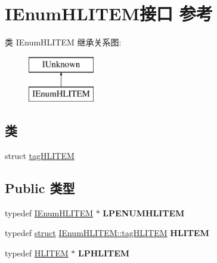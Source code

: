 \hypertarget{interface_i_enum_h_l_i_t_e_m}{}\section{I\+Enum\+H\+L\+I\+T\+E\+M接口 参考}
\label{interface_i_enum_h_l_i_t_e_m}
类 I\+Enum\+H\+L\+I\+T\+EM 继承关系图\+:\begin{figure}[H]
\begin{center}
\leavevmode
\includegraphics[height=2.000000cm]{interface_i_enum_h_l_i_t_e_m}
\end{center}
\end{figure}
\subsection*{类}
\begin{DoxyCompactItemize}
\item 
struct \hyperlink{struct_i_enum_h_l_i_t_e_m_1_1tag_h_l_i_t_e_m}{tag\+H\+L\+I\+T\+EM}
\end{DoxyCompactItemize}
\subsection*{Public 类型}
\begin{DoxyCompactItemize}
\item 
\mbox{\label{interface_i_enum_h_l_i_t_e_m_aa90c0fc4162b76d444260baa23be11a9}} 
typedef \hyperlink{interface_i_enum_h_l_i_t_e_m}{I\+Enum\+H\+L\+I\+T\+EM} $\ast$ {\bfseries L\+P\+E\+N\+U\+M\+H\+L\+I\+T\+EM}
\item 
\mbox{\label{interface_i_enum_h_l_i_t_e_m_a63444a199c40b45b24b20a81d312d9e7}} 
typedef \hyperlink{interfacestruct}{struct} \hyperlink{struct_i_enum_h_l_i_t_e_m_1_1tag_h_l_i_t_e_m}{I\+Enum\+H\+L\+I\+T\+E\+M\+::tag\+H\+L\+I\+T\+EM} {\bfseries H\+L\+I\+T\+EM}
\item 
\mbox{\label{interface_i_enum_h_l_i_t_e_m_acf7904ee5ed1de91399dc84e33543db4}} 
typedef \hyperlink{struct_i_enum_h_l_i_t_e_m_1_1tag_h_l_i_t_e_m}{H\+L\+I\+T\+EM} $\ast$ {\bfseries L\+P\+H\+L\+I\+T\+EM}
\end{DoxyCompactItemize}
